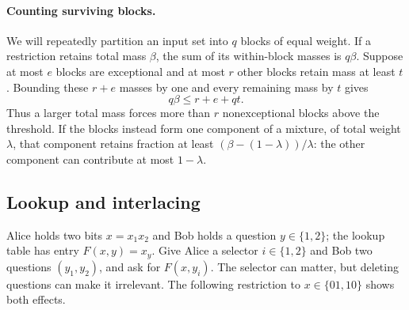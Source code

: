 \documentclass[11pt]{article} \usepackage[utf8]{inputenc}
\theoremstyle{plain} \newtheorem{theorem}{Theorem}[section]
\theoremstyle{definition} \newaliascnt{definition}{theorem}
\begin{document}
\paragraph{Counting surviving blocks.}
We will repeatedly partition an input set into $q$ blocks of equal weight.
If a restriction retains total mass $\beta$, the sum of its within-block
masses is $q\beta$. Suppose at most $e$ blocks are exceptional and at most
$r$ other blocks retain mass at least $t$. Bounding these $r+e$ masses by
one and every remaining mass by $t$ gives
\[
q\beta\le r+e+qt.
\]
Thus a larger total mass forces more than $r$ nonexceptional blocks above
the threshold. If the blocks instead form one component of a mixture,
of total weight $\lambda$, that component retains fraction at least
$(\beta-(1-\lambda))/\lambda$: the other component can contribute at most
$1-\lambda$.

\subsection{Lookup and interlacing}
\label{sec:interlacing}

Alice holds two bits $x=x_1x_2$ and Bob holds a question $y\in\{1,2\}$;
the lookup table has entry $F(x,y)=x_y$. Give Alice a selector $i\in\{1,2\}$
and Bob two questions $(y_1,y_2)$, and ask for $F(x,y_i)$.
The selector can matter, but deleting questions can make it irrelevant.
The following restriction to $x\in\{01,10\}$ shows both effects.
\end{document}
